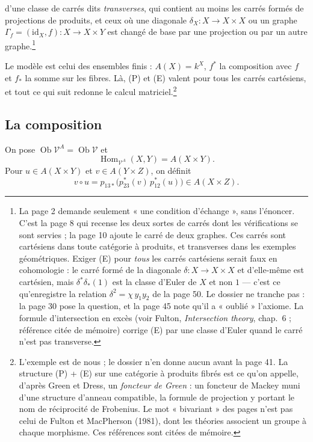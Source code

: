 \documentclass[11pt,a4paper]{article}
\begin{document}
d'une classe de carrés dits \emph{transverses}, qui contient au moins les
carrés formés de projections de produits, et ceux où une diagonale
$\delta_{X} \colon X \to X \times X$ ou un graphe
$\Gamma_{f} = (\mathrm{id}_{X}, f) \colon X \to X \times Y$ est changé de base
par une projection ou par un autre graphe.\footnote{La page 2 demande
seulement « une condition d'échange », sans l'énoncer. C'est la page 8 qui
recense les deux sortes de carrés dont les vérifications se sont servies ; la
page 10 ajoute le carré de deux graphes. Ces carrés sont cartésiens dans
toute catégorie à produits, et transverses dans les exemples géométriques.
Exiger (E) pour \emph{tous} les carrés cartésiens serait faux en cohomologie :
le carré formé de la diagonale $\delta \colon X \to X \times X$ et
d'elle-même est cartésien, mais $\delta^{*}\delta_{*}(1)$ est la classe d'Euler
de $X$ et non $1$ --- c'est ce qu'enregistre la relation
$\delta^{2} = \chi\, y_{1} y_{2}$ de la page 50. Le dossier ne tranche pas :
la page 30 pose la question, et la page 45 note qu'il a « oublié » l'axiome.
La formule d'intersection en excès (voir Fulton, \emph{Intersection theory},
chap.~6 ; référence citée de mémoire) corrige (E) par une classe d'Euler quand
le carré n'est pas transverse.}

Le modèle est celui des ensembles finis : $A(X) = k^{X}$, $f^{*}$ la
composition avec $f$ et $f_{*}$ la somme sur les fibres. Là, (P) et (E) valent
pour tous les carrés cartésiens, et tout ce qui suit redonne le calcul
matriciel.\footnote{L'exemple est de nous ; le dossier n'en donne aucun avant
la page 41. La structure (P) + (E) sur une catégorie à produits fibrés est ce
qu'on appelle, d'après Green et Dress, un \emph{foncteur de Green} :
un foncteur de Mackey muni d'une structure d'anneau compatible, la formule de
projection y portant le nom de réciprocité de Frobenius. Le mot
« bivariant » des pages n'est pas celui de Fulton et MacPherson (1981), dont
les théories associent un groupe à chaque morphisme. Ces références sont
citées de mémoire.}

\subsection*{La composition}

On pose $\operatorname{Ob} \mathcal{V}^{A} = \operatorname{Ob} \mathcal{V}$ et
\[ \operatorname{Hom}_{\mathcal{V}^{A}}(X, Y) = A(X \times Y) . \]
Pour $u \in A(X \times Y)$ et $v \in A(Y \times Z)$, on définit
\[ v \circ u = p_{13*}\bigl( p_{23}^{*}(v)\, p_{12}^{*}(u) \bigr) \in A(X \times Z) . \]
\end{document}
